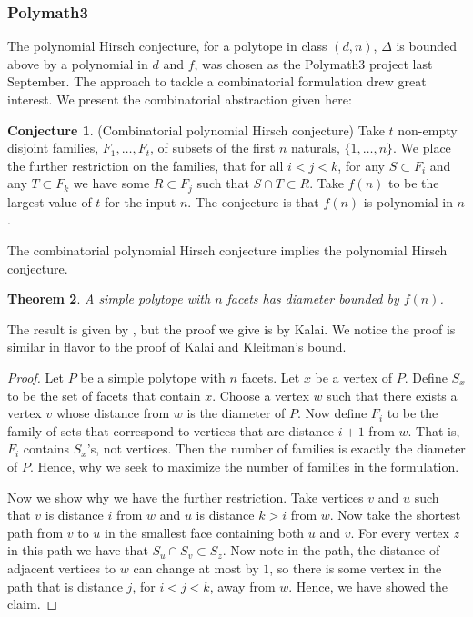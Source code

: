 \documentclass[11pt,a4paper]{article}
\newtheorem{thm}{Theorem}[section]
\theoremstyle{definition}
\newtheorem{conj}[thm]{Conjecture}
\begin{document}
\subsubsection{Polymath3}

The polynomial Hirsch conjecture, for a polytope in class $(d,n)$, $\Delta$ is bounded above by a polynomial in $d$ and $f$, was chosen as the Polymath3 project last September. The approach to tackle a combinatorial formulation drew great interest. We present the combinatorial abstraction given here:

\begin{conj}
(Combinatorial polynomial Hirsch conjecture) Take $t$ non-empty disjoint families, $F_1,\ldots,F_t$, of subsets of the first $n$ naturals, $\{1,\ldots, n\}$. We place the further restriction on the families, that for all $i<j<k$, for any $S\subset F_i$ and any $T\subset F_k$ we have some $R\subset F_j$ such that $S\cap T\subset R$. Take $f(n)$ to be the largest value of $t$ for the input $n$. The conjecture is that $f(n)$ is polynomial in $n$.
\end{conj}

The combinatorial polynomial Hirsch conjecture implies the polynomial Hirsch conjecture.
\begin{thm}
A simple polytope with $n$ facets has diameter bounded by $f(n)$.
\end{thm}
The result is given by \citet{eisen10}, but the proof we give is by Kalai. We notice the proof is similar in flavor to the proof of Kalai and Kleitman's bound.
\begin{proof}
Let $P$ be a simple polytope with $n$ facets. Let $x$ be a vertex of $P$. Define $S_x$ to be the set of facets that contain $x$. Choose a vertex $w$ such that there exists a vertex $v$ whose distance from $w$ is the diameter of $P$. Now define $F_i$ to be the family of sets that correspond to vertices that are distance $i+1$ from $w$. That is, $F_i$ contains $S_x$'s, not vertices. Then the number of families is exactly the diameter of $P$. Hence, why we seek to maximize the number of families in the formulation.

Now we show why we have the further restriction. Take vertices $v$ and $u$ such that $v$ is distance $i$ from $w$ and $u$ is distance $k>i$ from $w$. Now take the shortest path from $v$ to $u$ in the smallest face containing both $u$ and $v$. For every vertex $z$ in this path we have that $S_u\cap S_v\subset S_z$. Now note in the path, the distance of adjacent vertices to $w$ can change at most by $1$, so there is some vertex in the path that is distance $j$, for $i<j<k$, away from $w$. Hence, we have showed the claim.
\end{proof}
\end{document}
